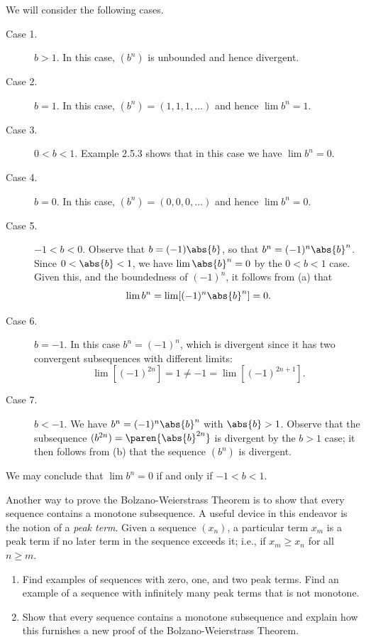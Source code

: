 \documentclass{lew98_solutions}
\begin{document}
\begin{solution}
    We will consider the following cases.
    \begin{description}
        \item[Case 1.] \( b > 1 \). In this case, \( (b^n) \) is unbounded and hence divergent.

        \item[Case 2.] \( b = 1 \). In this case, \( (b^n) = (1, 1, 1, \ldots) \) and hence \( \lim b^n = 1 \).

        \item[Case 3.] \( 0 < b < 1 \). Example 2.5.3 shows that in this case we have \( \lim b^n = 0 \).

        \item[Case 4.] \( b = 0 \). In this case, \( (b^n) = (0, 0, 0, \ldots) \) and hence \( \lim b^n = 0 \).

        \item[Case 5.] \( -1 < b < 0 \). Observe that \( b = (-1) \abs{b} \), so that \( b^n = (-1)^n \abs{b}^n \). Since \( 0 < \abs{b} < 1 \), we have \( \lim \abs{b}^n = 0 \) by the \( 0 < b < 1 \) case. Given this, and the boundedness of \( (-1)^n \), it follows from  (a) that
        \[
            \lim b^n = \lim [(-1)^n \abs{b}^n] = 0.
        \]

        \item [Case 6.] \( b = -1 \). In this case \( b^n = (-1)^n \), which is divergent since it has two convergent subsequences with different limits:
        \[
            \lim [(-1)^{2n}] = 1 \neq -1 = \lim [(-1)^{2n+1}].
        \]

        \item[Case 7.] \( b < -1 \). We have \( b^n = (-1)^n \abs{b}^n \) with \( \abs{b} > 1 \). Observe that the subsequence \( (b^{2n}) = \paren{ \abs{b}^{2n} } \) is divergent by the \( b > 1 \) case; it then follows from  (b) that the sequence \( (b^n) \) is divergent.
    \end{description}
    We may conclude that \( \lim b^n = 0 \) if and only if \( -1 < b < 1 \).
\end{solution}

\begin{exercise}
\label{ex:2.5.8}
    Another way to prove the Bolzano-Weierstrass Theorem is to show that every sequence contains a monotone subsequence. A useful device in this endeavor is the notion of a \textit{peak term}. Given a sequence \( (x_n) \), a particular term \( x_m \) is a peak term if no later term in the sequence exceeds it; i.e., if \( x_m \geq x_n \) for all \( n \geq m \).
    \begin{enumerate}
        \item Find examples of sequences with zero, one, and two peak terms. Find an example of a sequence with infinitely many peak terms that is not monotone.

        \item Show that every sequence contains a monotone subsequence and explain how this furnishes a new proof of the Bolzano-Weierstrass Theorem.
    \end{enumerate}
\end{exercise}
\end{document}
